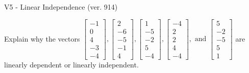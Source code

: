 \begin{exercise}
  \begin{exerciseTitle}V5 - Linear Independence (ver. 914)\end{exerciseTitle}
  \begin{exerciseStatement}
    Explain why the vectors \(\left[\begin{array}{r}
-1 \\
0 \\
4 \\
-3 \\
-4
\end{array}\right] , \left[\begin{array}{r}
2 \\
-6 \\
-5 \\
-1 \\
4
\end{array}\right] , \left[\begin{array}{r}
1 \\
-5 \\
-2 \\
5 \\
-4
\end{array}\right] , \left[\begin{array}{r}
-4 \\
2 \\
2 \\
4 \\
-4
\end{array}\right] , \text{ and } \left[\begin{array}{r}
5 \\
-2 \\
-5 \\
5 \\
1
\end{array}\right]\) are linearly dependent or linearly independent.	



\end{exerciseStatement}
\end{exercise}
